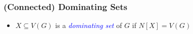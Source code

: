 \documentclass{beamer}
\newcommand{\emphh}[1]{\textcolor{blue}{\emph{#1}}}
\begin{document}
\begin{frame}
  \frametitle{(Connected) Dominating Sets}

  \begin{itemize}[<+->]
    \item $X\subseteq V(G)$ is a \emphh{dominating set} of $G$ if $N[X]=V(G)$
    \begin{center}

\end{center}
\end{itemize}
\end{frame}
\end{document}
